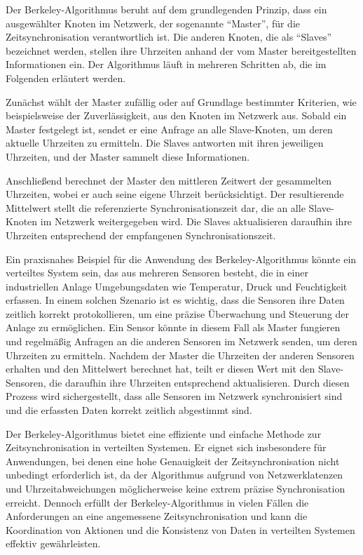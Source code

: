 Der Berkeley-Algorithmus beruht auf dem grundlegenden Prinzip, dass ein ausgewählter Knoten im Netzwerk, der sogenannte \enquote{Master}, für die Zeitsynchronisation verantwortlich ist. Die anderen Knoten, die als \enquote{Slaves} bezeichnet werden, stellen ihre Uhrzeiten anhand der vom Master bereitgestellten Informationen ein. Der Algorithmus läuft in mehreren Schritten ab, die im Folgenden erläutert werden.

Zunächst wählt der Master zufällig oder auf Grundlage bestimmter Kriterien, wie beispielsweise der Zuverlässigkeit, aus den Knoten im Netzwerk aus. Sobald ein Master festgelegt ist, sendet er eine Anfrage an alle Slave-Knoten, um deren aktuelle Uhrzeiten zu ermitteln. Die Slaves antworten mit ihren jeweiligen Uhrzeiten, und der Master sammelt diese Informationen.

Anschließend berechnet der Master den mittleren Zeitwert der gesammelten Uhrzeiten, wobei er auch seine eigene Uhrzeit berücksichtigt. Der resultierende Mittelwert stellt die referenzierte Synchronisationszeit dar, die an alle Slave-Knoten im Netzwerk weitergegeben wird. Die Slaves aktualisieren daraufhin ihre Uhrzeiten entsprechend der empfangenen Synchronisationszeit.

Ein praxisnahes Beispiel für die Anwendung des Berkeley-Algorithmus könnte ein verteiltes System sein, das aus mehreren Sensoren besteht, die in einer industriellen Anlage Umgebungsdaten wie Temperatur, Druck und Feuchtigkeit erfassen. In einem solchen Szenario ist es wichtig, dass die Sensoren ihre Daten zeitlich korrekt protokollieren, um eine präzise Überwachung und Steuerung der Anlage zu ermöglichen.
Ein Sensor könnte in diesem Fall als Master fungieren und regelmäßig Anfragen an die anderen Sensoren im Netzwerk senden, um deren Uhrzeiten zu ermitteln. Nachdem der Master die Uhrzeiten der anderen Sensoren erhalten und den Mittelwert berechnet hat, teilt er diesen Wert mit den Slave-Sensoren, die daraufhin ihre Uhrzeiten entsprechend aktualisieren. Durch diesen Prozess wird sichergestellt, dass alle Sensoren im Netzwerk synchronisiert sind und die erfassten Daten korrekt zeitlich abgestimmt sind.

Der Berkeley-Algorithmus bietet eine effiziente und einfache Methode zur Zeitsynchronisation in verteilten Systemen. Er eignet sich insbesondere für Anwendungen, bei denen eine hohe Genauigkeit der Zeitsynchronisation nicht unbedingt erforderlich ist, da der Algorithmus aufgrund von Netzwerklatenzen und Uhrzeitabweichungen möglicherweise keine extrem präzise Synchronisation erreicht. Dennoch erfüllt der Berkeley-Algorithmus in vielen Fällen die Anforderungen an eine angemessene Zeitsynchronisation und kann die Koordination von Aktionen und die Konsistenz von Daten in verteilten Systemen effektiv gewährleisten.

